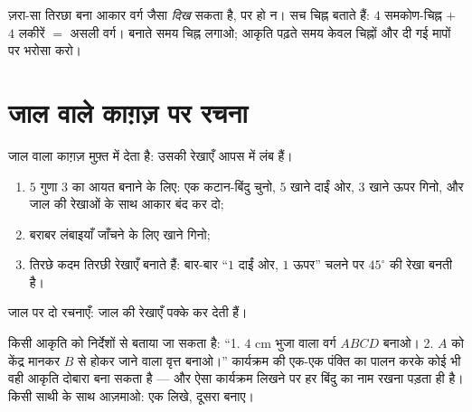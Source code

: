 \begin{example}[चिह्न क्यों ज़रूरी हैं]\label{ex:g3:shapes:marks}
ज़रा-सा तिरछा बना आकार वर्ग जैसा \emph{दिख} सकता है, पर हो न।
सच चिह्न बताते हैं: $4$ समकोण-चिह्न $+$ $4$ लकीरें $=$ असली
वर्ग। बनाते समय चिह्न लगाओ; आकृति पढ़ते समय केवल चिह्नों और दी
गई मापों पर भरोसा करो।
\end{example}

\section{जाल वाले काग़ज़ पर रचना}

\begin{method}[जाल पर रचनाएँ]\label{met:g3:shapes:grid}
जाल वाला काग़ज़ मुफ़्त में  देता है: उसकी रेखाएँ आपस में लंब हैं।
\begin{enumerate}
  \item $5$ गुणा $3$ का आयत बनाने के लिए: एक कटान-बिंदु चुनो,
        $5$ खाने दाईं ओर, $3$ खाने ऊपर गिनो, और जाल की रेखाओं
        के साथ आकार बंद कर दो;
  \item बराबर लंबाइयाँ जाँचने के लिए खाने गिनो;
  \item तिरछे कदम तिरछी रेखाएँ बनाते हैं: बार-बार ``$1$ दाईं
        ओर, $1$ ऊपर'' चलने पर $45^\circ$ की रेखा बनती है।
\end{enumerate}
\end{method}

\begin{omfigure}

{\small जाल पर दो रचनाएँ: जाल की रेखाएँ  पक्के कर
देती हैं।}
\end{omfigure}

\begin{example}[रचना का कार्यक्रम]\label{ex:g3:shapes:program}
किसी आकृति को निर्देशों से बताया जा सकता है:
``1. $4$ cm भुजा वाला वर्ग $ABCD$ बनाओ। 2. $A$ को केंद्र मानकर
$B$ से होकर जाने वाला वृत्त बनाओ।'' कार्यक्रम की एक-एक पंक्ति
का पालन करके कोई भी वही आकृति दोबारा बना सकता है --- और ऐसा
कार्यक्रम लिखने पर हर बिंदु का नाम रखना पड़ता ही है। किसी साथी
के साथ आज़माओ: एक लिखे, दूसरा बनाए।
\end{example}

